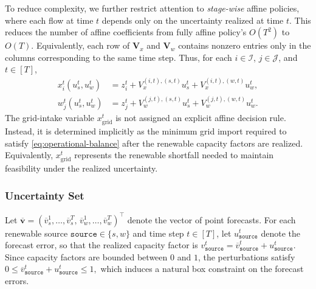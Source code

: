 \documentclass[11pt, letter]{article}
\begin{document}
To reduce complexity, we further restrict attention to \emph{stage-wise} affine policies, where each flow at time $t$ depends only on the uncertainty realized at time $t$. This reduces the number of affine coefficients from fully affine policy's $O(T^2)$ to $O(T)$. Equivalently, each row of $\boldsymbol{V}_x$ and $\boldsymbol{V}_w$ contains nonzero entries only in the columns corresponding to the same time step. Thus, for each $i\in\mathcal{I}$, $j\in\mathcal{J}$, and $t\in[T]$,
\begin{subequations}
\begin{align}
x_i^t(u_s^t,u_w^t)
&=
z_i^t
+
V_x^{(i,t),(s,t)}u_s^t
+
V_x^{(i,t),(w,t)}u_w^t,
\label{eq:adr-x}
\\
w_j^t(u_s^t,u_w^t)
&=
z_j^t
+
V_w^{(j,t),(s,t)}u_s^t
+
V_w^{(j,t),(w,t)}u_w^t.
\label{eq:adr-w}
\end{align}
\end{subequations}
The grid-intake variable $x_{\mathrm{grid}}^t$ is not assigned an explicit affine decision rule. Instead, it is determined implicitly as the minimum grid import required to satisfy \eqref{eq:operational-balance} after the renewable capacity factors are realized. Equivalently, $x_{\mathrm{grid}}^t$ represents the renewable shortfall needed to maintain feasibility under the realized uncertainty. 

\subsubsection{Uncertainty Set}

Let
\(
\overline{\boldsymbol{v}}
=
(\overline{v}_s^1,\ldots,\overline{v}_s^T,\,
\overline{v}_w^1,\ldots,\overline{v}_w^T)^\top
\)
denote the vector of point forecasts. For each renewable source
$\texttt{source}\in\{s,w\}$ and time step $t\in[T]$, let
$u_{\texttt{source}}^t$ denote the forecast error, so that the realized
capacity factor is
\(
v_{\texttt{source}}^t
=
\overline{v}_{\texttt{source}}^t
+
u_{\texttt{source}}^t.
\) Since capacity factors are bounded between $0$ and $1$, the perturbations satisfy
\(
0\le
\overline{v}_{\texttt{source}}^t
+
u_{\texttt{source}}^t
\le
1,
\)
which induces a natural box constraint on the forecast errors.
\end{document}
